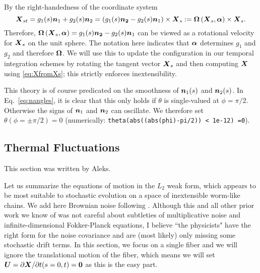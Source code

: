 By the right-handedness of the coordinate system
\begin{equation}
\label{eq:Xsupdate}
\boldsymbol{X}_{st} = g_1(s)\boldsymbol{n}_1 + g_2(s) \boldsymbol{n}_2 = \left(g_1(s)\boldsymbol{n_2}-g_2(s)\boldsymbol{n}_1\right) \times \boldsymbol{X}_s:=\boldsymbol{\Omega}\left(\boldsymbol{X}_s, \boldsymbol{\alpha}\right) \times \boldsymbol{X}_s. 
\end{equation}
Therefore, $\boldsymbol{\Omega}\left(\boldsymbol{X}_s, \boldsymbol{\alpha}\right)=g_1(s)\boldsymbol{n_2}-g_2(s)\boldsymbol{n}_1$ can be viewed as a rotational velocity for $\boldsymbol{X}_s$ on the unit sphere. The notation here indicates that $\boldsymbol{\alpha}$ determines $g_1$ and $g_2$ and therefore $\boldsymbol{\Omega}$. We will use this to update the configuration in our temporal integration schemes by rotating the tangent vector $\boldsymbol{X}_s$ and then computing $\boldsymbol{X}$ using \eqref{eq:XfromXs}; this strictly enforces inextensibility.

This theory is of course predicated on the smoothness of $\boldsymbol{n}_1(s)$ and $\boldsymbol{n}_2(s)$. In Eq.\ \eqref{eq:nangles}, it is clear that this only holds if $\theta$ is single-valued at $\phi=\pi/2$. Otherwise the signs of $\boldsymbol{n}_1$ and $\boldsymbol{n}_2$ can oscillate. We therefore set $\theta \left(\phi=\pm \pi/2\right)=0$ (numerically: \texttt{theta(abs((abs(phi)-pi/2)) < 1e-12) =0}). 

\subsection{Thermal Fluctuations}

This section was written by Aleks.

Let us summarize the equations of motion in the $L_2$ weak form, which appears to be most suitable to stochastic evolution on a space of inextensible worm-like chains. We add here Brownian noise following \cite{FluctuatingFibers_Saintillan_PNAS,FluctuatingFibers_Saintillan_PF}. Although this and all other prior work we know of was not careful about subtleties of multiplicative noise and infinite-dimensional Fokker-Planck equations, I believe ``the physicists" have the right form for the noise covariance and are (most likely) only missing some stochastic drift terms. In this section, we focus on a single fiber and we will ignore the translational motion of the fiber, which means we will set $\boldsymbol{U}= {\partial\boldsymbol{X}}/{\partial t}(s=0,t) = \boldsymbol{0}$ as this is the easy part.

